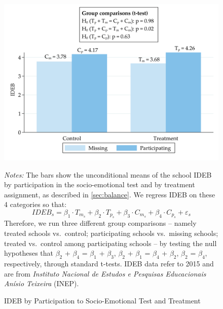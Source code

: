 \documentclass[11pt,a4paper]{article}
\begin{document}
	\null
	\vfill
	\begin{figure}[ht!]
		\caption{IDEB by Participation to Socio-Emotional Test and Treatment}
		\label{fig:predict_participation}
		\centering
		
		\includegraphics[width=14cm]{DataWork/Output/Figures/figA1_predict_participation.png}
		
		\noindent
		\justifying
		\small{\textit{Notes:} The bars show the unconditional means of the school IDEB by participation in the socio-emotional test and by treatment assignment, as described in \ref{sec:balance}. We regress IDEB on these 4 categories so that:
			\begin{equation*}
			IDEB_s = \beta_1 \cdot T_{m_s} + \beta_2 \cdot T_{p_s} + \beta_3 \cdot C_{m_s} + \beta_4 \cdot C_{p_s} + \varepsilon_s
			\end{equation*}
			Therefore, we run three different group comparisons -- namely treated schools vs.\ control; participating schools vs.\ missing schools; treated vs.\ control among participating schools -- by testing the null hypotheses that $\beta_2$ + $\beta_4$ = $\beta_1$ + $\beta_3$, $\beta_2$ + $\beta_1$ = $\beta_4$ + $\beta_2$, $\beta_2$ = $\beta_4$, respectively, through standard t-tests. IDEB data refer to 2015 and are from \textit{Instituto Nacional de Estudos e Pesquisas Educacionais Anísio Teixeira} (INEP).}
	\end{figure}
	\vfill
	
\end{document}

